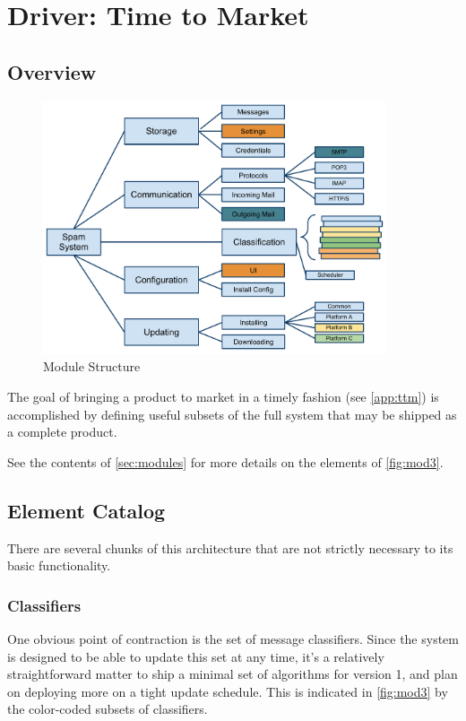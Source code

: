 \documentclass[letterpaper,11pt]{article}
\begin{document}
\section{Driver: Time to Market}
\label{sec:ttm}

\subsection{Overview}
\begin{figure}[h]
  \centering
  \includegraphics[width=4in]{ArchModuleDecomp.pdf}
  \caption{Module Structure}
  \label{fig:mod3}
\end{figure}

The goal of bringing a product to market in a timely fashion (see
\autoref{app:ttm}) is accomplished by defining useful subsets of the full
system that may be shipped as a complete product.

See the contents of \autoref{sec:modules} for more details on the elements of
\autoref{fig:mod3}.

\subsection{Element Catalog}
There are several chunks of this architecture that are not strictly necessary
to its basic functionality.

\subsubsection{Classifiers}
One obvious point of contraction is the set of message classifiers.  Since the
system is designed to be able to update this set at any time, it's a
relatively straightforward matter to ship a minimal set of algorithms for
version 1, and plan on deploying more on a tight update schedule.  This is
indicated in \autoref{fig:mod3} by the color-coded subsets of classifiers.
\end{document}
